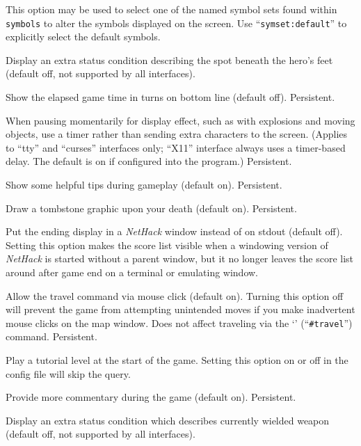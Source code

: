 \documentclass[titlepage]{article}
\begin{document}
\begin{description}[font=\mdseries\itshape]
This option may be used to select one of the named symbol sets found within
\texttt{symbols} to alter the symbols displayed on the screen.
Use ``\texttt{symset:default}'' to explicitly select the default symbols.
\item[terrainstatus]
Display an extra status condition describing the spot beneath the hero's
feet (default off, not supported by all interfaces).
\item[time]
Show the elapsed game time in turns on bottom line (default off).  Persistent.
\item[timed\textunderscore delay]
When pausing momentarily for display effect, such as with explosions and
moving objects, use a timer rather than sending extra characters to the
screen.  (Applies to ``tty'' and ``curses'' interfaces only; ``X11'' interface always
uses a timer-based delay.  The default is on if configured into the
program.)  Persistent.
\item[tips]
Show some helpful tips during gameplay (default on).  Persistent.
\item[tombstone]
Draw a tombstone graphic upon your death (default on).  Persistent.
\item[toptenwin]
Put the ending display in a \textit{NetHack} window instead of on stdout (default off).
Setting this option makes the score list visible when a windowing version
of \textit{NetHack} is started without a parent window, but it no longer leaves
the score list around after game end on a terminal or emulating window.
\item[travel]
Allow the travel command via mouse click (default on).
Turning this option off will prevent the game from attempting unintended
moves if you make inadvertent mouse clicks on the map window.
Does not affect traveling via the `\texttt{\textunderscore}' (``\texttt{\#travel}'')
command.  Persistent.
\item[tutorial]
Play a tutorial level at the start of the game.
Setting this option on or off in the config file will skip the query.
\item[verbose]
Provide more commentary during the game (default on).  Persistent.
\item[weaponstatus]
Display an extra status condition which describes currently wielded weapon
(default off, not supported by all interfaces).

\end{description}
\end{document}
